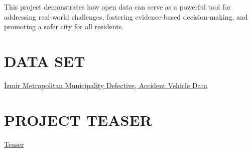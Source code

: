 \documentclass[
  11pt,
  a4paper,
  DIV=11,
  numbers=noendperiod]{scrartcl}
\begin{document}
This project demonstrates how open data can serve as a powerful tool for
addressing real-world challenges, fostering evidence-based
decision-making, and promoting a safer city for all residents.

\section{\texorpdfstring{\textbf{DATA SET}}{DATA SET}}\label{data-set}

\href{https://acikveri.bizizmir.com/dataset/7373e9b2-bdbe-4957-b980-b81329974bb2/resource/e4832801-ccfe-4e29-8a14-5c7d63545984/download/izbb-kaza-ariza-verileri.xlsx}{İzmir
Metropolitan Municipality Defective, Accident Vehicle Data}

\section{\texorpdfstring{\textbf{PROJECT
TEASER}}{PROJECT TEASER}}\label{project-teaser}

\href{https://drive.google.com/file/d/1H4Ucpe4dcfebwgcHEPuWWb47ryz_aU3_/view?usp=drivesdk}{Teaser}
\end{document}
